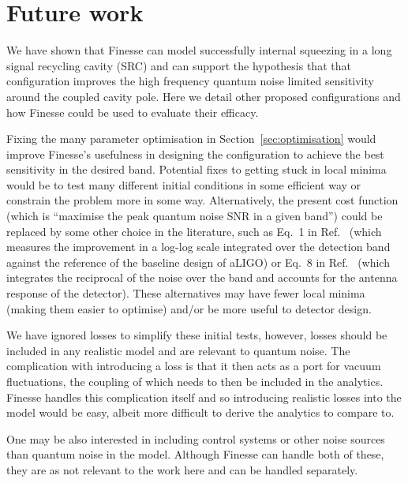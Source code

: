 \documentclass[aps,pra,superscriptaddress,reprint,nofootinbib]{revtex4-1}
\begin{document}
\section{Future work}
\label{sec:future_work}

We have shown that Finesse can model successfully internal squeezing in a long signal recycling cavity (SRC) and can support the hypothesis that that configuration improves the high frequency quantum noise limited sensitivity around the coupled cavity pole. Here we detail other proposed configurations and how Finesse could be used to evaluate their efficacy.


Fixing the many parameter optimisation in Section~\ref{sec:optimisation} would improve Finesse’s usefulness in designing the configuration to achieve the best sensitivity in the desired band. Potential fixes to getting stuck in local minima would be to test many different initial conditions in some efficient way or constrain the problem more in some way. Alternatively, the present cost function (which is “maximise the peak quantum noise SNR in a given band”) could be replaced by some other choice in the literature, such as Eq.~1 in Ref.~\cite{Miao_2014} (which measures the improvement in a log-log scale integrated over the detection band against the reference of the baseline design of aLIGO) or Eq.~8 in Ref.~\cite{Martynov_2019} (which integrates the reciprocal of the noise over the band and accounts for the antenna response of the detector). These alternatives may have fewer local minima (making them easier to optimise) and/or be more useful to detector design.


We have ignored losses to simplify these initial tests, however, losses should be included in any realistic model and are relevant to quantum noise. The complication with introducing a loss is that it then acts as a port for vacuum fluctuations, the coupling of which needs to then be included in the analytics. Finesse handles this complication itself and so introducing realistic losses into the model would be easy, albeit more difficult to derive the analytics to compare to.


One may be also interested in including control systems or other noise sources than quantum noise in the model. Although Finesse can handle both of these, they are as not relevant to the work here and can be handled separately.
\end{document}
